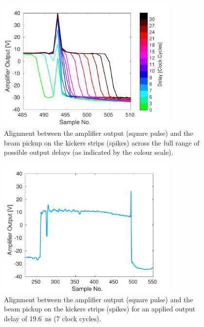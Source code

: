 \begin{figure}
  \centering
  \includegraphics[width=0.8\textwidth]{Figures/commissioning/absDelayAll_endPulse}
  \caption{Alignment between the amplifier output (square pulse) and the beam pickup on the kickers strips (spikes) across the full range of possible output delays (as indicated by the colour scale).}
  \label{f:absDelayAll_endPulse}
\end{figure}

\begin{figure}
  \centering
  \includegraphics[width=0.8\textwidth]{Figures/commissioning/absDelay7_all}
  \caption{Alignment between the amplifier output (square pulse) and the beam pickup on the kickers strips (spikes) for an applied output delay of 19.6~ns (7 clock cycles).}
  \label{f:absDelay7_all}
\end{figure}

